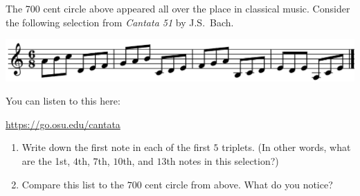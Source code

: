 \documentclass[12pt,noauthor,nooutcomes,hints, handout]{ximera}
\begin{document}
\begin{question}
The 700 cent circle above appeared all over the place in classical music.
Consider the following selection from \emph{Cantata 51} by J.S.\ Bach.


\centerline{\includegraphics[width=.9\textwidth]{generators/Bach.png}}

You can listen to this here:

\begin{center}
\url{https://go.osu.edu/cantata}
\end{center}

\begin{enumerate}
    \item Write down the first note in each of the first $5$ triplets. (In other words, what are the 1st, $4$th, $7$th, $10$th, and $13$th notes in this selection?)

\answerspace


    \item Compare this list to the $700$ cent circle from above. What do you notice?
\end{enumerate}
\end{question}
\end{document}
